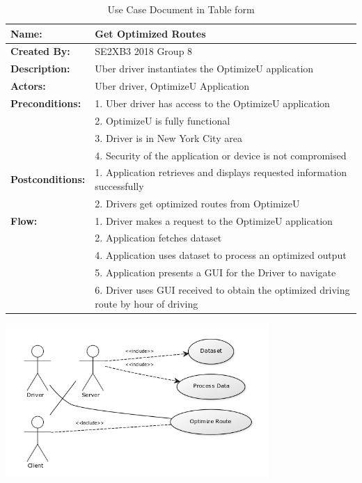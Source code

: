 \documentclass[12pt]{article}
\begin{document}
\begin{table}[H]
 \centering
  \begin{adjustbox}{max width=\textwidth}
  \begin{tabular}{*{2}{|l}|}
  \hline
  \textbf{Name:} & Get Optimized Routes\\
  \hline
  \textbf{Created By:} & SE2XB3 2018 Group 8\\
  \hline
  \textbf{Description:} & Uber driver instantiates the OptimizeU application\\
  \hline
  \textbf{Actors:} & Uber driver, OptimizeU Application\\
  \hline
  \textbf{Preconditions:} & 1. Uber driver has access to the OptimizeU application\\
  						  & 2. OptimizeU is fully functional\\
  						  & 3. Driver is in New York City area\\
  						  &	4. Security of the application or device is not compromised\\
  \hline
  \textbf{Postconditions:} & 1. Application retrieves and displays requested information successfully\\
                          & 2. Drivers get optimized routes from OptimizeU\\
  \hline
  \textbf{Flow:} & 1. Driver makes a request to the OptimizeU application\\
                 & 2. Application fetches dataset\\
                 & 4. Application uses dataset to process an optimized output\\
                 & 5. Application presents a GUI for the Driver to navigate\\
                 & 6. Driver uses GUI received to obtain the optimized driving route by hour of driving\\
  \hline
\end{tabular}
\end{adjustbox}
  \caption{Use Case Document in Table form}
  \label{usecase}
\end{table}
\includegraphics[width=100mm,scale=0.9]{Uses.png}
\end{document}
